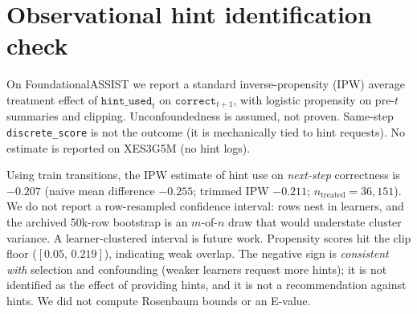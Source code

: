 \documentclass[review,12pt]{elsarticle}
\begin{document}
\section{Observational hint identification check}
\label{sec:ate-supp}
On FoundationalASSIST we report a standard inverse-propensity (IPW)
average treatment effect of $\texttt{hint\_used}_t$ on
$\texttt{correct}_{t+1}$, with logistic propensity on pre-$t$ summaries
and clipping. Unconfoundedness is assumed, not proven. Same-step
\texttt{discrete\_score} is not the outcome (it is mechanically tied to
hint requests). No estimate is reported on XES3G5M (no hint logs).

Using train transitions, the IPW estimate of hint use on
\emph{next-step} correctness is $-0.207$ (naive mean difference
$-0.255$; trimmed IPW $-0.211$;
$n_{\mathrm{treated}}{=}36{,}151$).
We do not report a row-resampled confidence interval: rows nest in
learners, and the archived 50k-row bootstrap is an $m$-of-$n$ draw
that would understate cluster variance. A learner-clustered interval
is future work. Propensity scores hit the clip floor
($[0.05,\,0.219]$), indicating weak overlap. The negative sign is
\emph{consistent with} selection and confounding (weaker learners
request more hints); it is not identified as the effect of providing
hints, and it is not a recommendation against hints. We did not compute
Rosenbaum bounds or an E-value.

\end{document}
